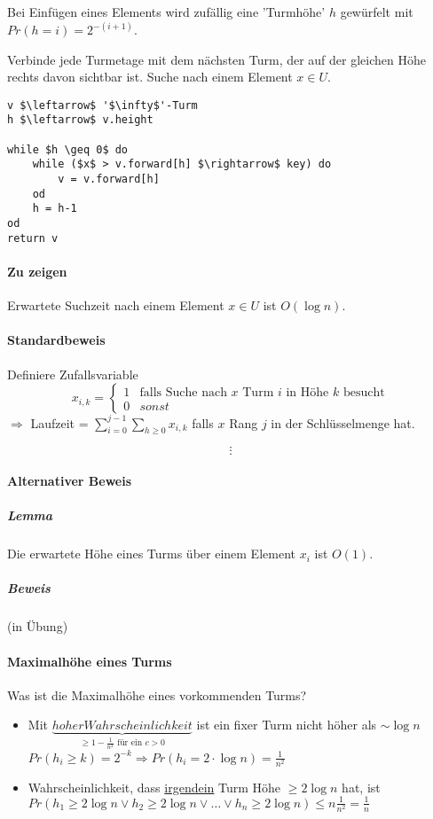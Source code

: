 \par\medskip
Bei Einfügen eines Elements wird zufällig eine 'Turmhöhe' $h$ gewürfelt mit $Pr(h=i)=2^{-(i+1)}$.\par\medskip

Verbinde jede Turmetage mit dem nächsten Turm, der auf der gleichen Höhe rechts davon sichtbar ist. Suche nach einem Element $x \in U$.\par\medskip

\begin{lstlisting}[mathescape]
v $\leftarrow$ '$\infty$'-Turm
h $\leftarrow$ v.height

while $h \geq 0$ do
	while ($x$ > v.forward[h] $\rightarrow$ key) do
		v = v.forward[h]
	od
	h = h-1
od
return v
\end{lstlisting}

\paragraph*{Zu zeigen} Erwartete Suchzeit nach einem Element $x \in U$ ist $O(\log n)$.

\paragraph*{Standardbeweis} Definiere Zufallsvariable
\begin{equation}
   x_{i,k} = 
   \begin{cases}
     1 & \text{falls Suche nach } x \text{ Turm } i \text{ in Höhe } k \text{ besucht} \\
     0 & sonst
   \end{cases}
\end{equation}
$\Rightarrow$ Laufzeit = $\sum\limits_{i=0}^{j-1} \sum\limits_{h \geq 0} x_{i,k}$ falls $x$ Rang $j$ in der Schlüsselmenge hat.

$$\vdots$$

\paragraph*{Alternativer Beweis}
\subparagraph*{Lemma} Die erwartete Höhe eines Turms über einem Element $x_i$ ist $O(1)$.
\subparagraph*{Beweis} (in Übung)

\paragraph*{Maximalhöhe eines Turms} Was ist die Maximalhöhe eines vorkommenden Turms?
\begin{itemize}
	\item Mit $\underbrace{hoher Wahrscheinlichkeit}_{\geq 1 - \frac{1}{n^2} \text{ für ein } c>0}$
	ist ein fixer Turm nicht höher als $\sim \log n$
	$Pr(h_i \geq k) = 2^{-k} \Rightarrow Pr(h_i = 2 \cdot \log n) = \frac{1}{n^2}$
	\item Wahrscheinlichkeit, dass \underline{irgendein} Turm Höhe $\geq 2 \log n$ hat, ist $Pr(h_1 \geq 2 \log n \lor h_2 \geq 2 \log n \lor \dots \lor h_n \geq 2 \log n) \leq n \frac{1}{n^2} = \frac{1}{n}$
\end{itemize}

